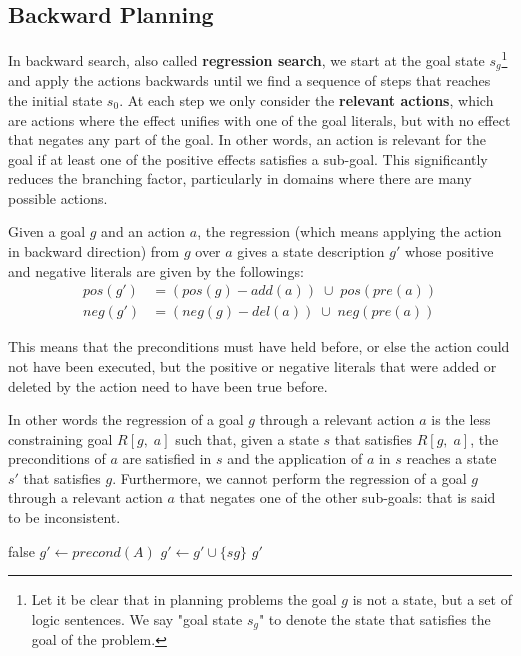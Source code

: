 \documentclass{article}
\begin{document}
\subsection{Backward Planning}
In backward search, also called \textbf{regression search}, we start at the goal state $s_g$\footnote{
    Let it be clear that in planning problems the goal $g$ is not a state, but a set of logic sentences. We say "goal state $s_g$" to denote the state that satisfies the goal of the problem.
} and apply the actions backwards until we find a sequence of steps that reaches the initial state $s_0$. At each step we only consider the \textbf{relevant actions}, which are actions where the effect unifies with one of the goal literals, but with no effect that negates any part of the goal. In other words, an action is relevant for the goal if at least one of the positive effects satisfies a sub-goal.  This significantly reduces the branching factor, particularly in domains where there are many possible actions.

Given a goal $g$ and an action $a$, the regression (which means applying the action in backward direction) from $g$ over $a$ gives a state description $g'$ whose positive and negative literals are given by the followings:
\begin{align*}
    pos(g') &= (pos(g) - add(a))\;\cup\; pos(pre(a)) \\
    neg(g') &= (neg(g) - del(a))\;\cup\;neg(pre(a))
\end{align*}

\noindent
This means that the preconditions must have held before, or else the action could not have been executed, but the positive or negative literals that were added or deleted by the action need to have been true before. 

In other words the regression of a goal $g$ through a relevant action $a$ is the less constraining goal $R[g,\;a]$ such that, given a state $s$ that satisfies $R[g,\;a]$, the preconditions of $a$ are satisfied in $s$ and the application of $a$ in $s$ reaches a state $s'$ that satisfies $g$. Furthermore, we cannot perform the regression of a goal $g$ through a relevant action $a$ that negates one of the other sub-goals: that is said to be inconsistent.

\vspace{5mm}
\begin{algorithmic}
        \State \Return false
    \EndIf
    \State $g' \gets precond(A)$
            \State $g' \gets g' \cup \{sg\}$
        \EndIf
    \EndFor
    \State \Return $g'$
\EndFunction
\end{algorithmic}
\vspace{5mm}
    
\end{document}
